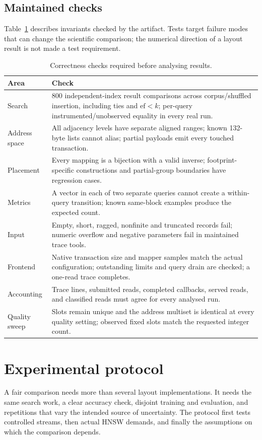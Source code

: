 \documentclass[11pt,a4paper]{report}
\begin{document}
\subsection{Maintained checks}
Table~\ref{tab:checks} describes invariants checked by the artifact. Tests target failure modes that can change the scientific comparison; the numerical direction of a layout result is not made a test requirement.
\begin{table}[htbp]\centering\small
\caption[Correctness checks]{Correctness checks required before analysing results.}\label{tab:checks}
\begin{tabular}{p{}p{}}\toprule
Area & Check\\\midrule
Search & 800 independent-index result comparisons across corpus/shuffled insertion, including ties and $\mathrm{ef}<k$; per-query instrumented/unobserved equality in every real run.\\
Address space & All adjacency levels have separate aligned ranges; known 132-byte lists cannot alias; partial payloads emit every touched transaction.\\
Placement & Every mapping is a bijection with a valid inverse; footprint-specific constructions and partial-group boundaries have regression cases.\\
Metrics & A vector in each of two separate queries cannot create a within-query transition; known same-block examples produce the expected count.\\
Input & Empty, short, ragged, nonfinite and truncated records fail; numeric overflow and negative parameters fail in maintained trace tools.\\
Frontend & Native transaction size and mapper samples match the actual configuration; outstanding limits and query drain are checked; a one-read trace completes.\\
Accounting & Trace lines, submitted reads, completed callbacks, served reads, and classified reads must agree for every analysed run.\\
Quality sweep & Slots remain unique and the address multiset is identical at every quality setting; observed fixed slots match the requested integer count.\\\bottomrule
\end{tabular}
\end{table}

\section{Experimental protocol}
A fair comparison needs more than several layout implementations. It needs the same search work, a clear accuracy check, disjoint training and evaluation, and repetitions that vary the intended source of uncertainty. The protocol first tests controlled streams, then actual HNSW demands, and finally the assumptions on which the comparison depends.
\end{document}
